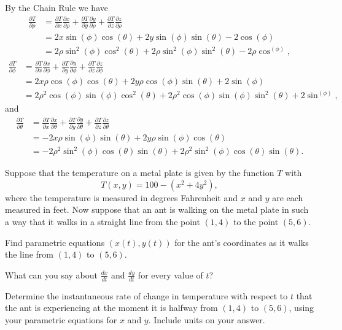 \begin{exercises}
\begin{exerciseSolution}
    \item By the Chain Rule we have 
\begin{align*}
\frac{\partial T}{\partial\rho} &= \frac{\partial T}{\partial x} \frac{\partial x}{\partial\rho} + \frac{\partial T}{\partial y} \frac{\partial y}{\partial\rho}  + \frac{\partial T}{\partial z} \frac{\partial z}{\partial\rho} \\
	&= 2x\sin(\phi) \cos(\theta) + 2y\sin(\phi) \sin(\theta) - 2\cos(\phi) \\
	&= 2\rho\sin^2(\phi) \cos^2(\theta) + 2\rho\sin^2(\phi) \sin^2(\theta) - 2\rho\cos^(\phi),
\end{align*}
\begin{align*}
\frac{\partial T}{\partial \phi} &= \frac{\partial T}{\partial x} \frac{\partial x}{\partial \phi} + \frac{\partial T}{\partial y} \frac{\partial y}{\partial \phi}  + \frac{\partial T}{\partial z} \frac{\partial z}{\partial \phi} \\
	&= 2x \rho \cos(\phi) \cos(\theta) + 2y \rho \cos(\phi) \sin(\theta) + 2\sin(\phi) \\
	&= 2\rho^2 \cos(\phi) \sin(\phi) \cos^2(\theta) + 2\rho^2 \cos(\phi) \sin(\phi) \sin^2(\theta) + 2\sin^(\phi),
\end{align*}
and
\begin{align*}
\frac{\partial T}{\partial \theta} &= \frac{\partial T}{\partial x} \frac{\partial x}{\partial \theta} + \frac{\partial T}{\partial y} \frac{\partial y}{\partial \theta}  + \frac{\partial T}{\partial z} \frac{\partial z}{\partial \theta} \\
	&= -2x \rho \sin(\phi) \sin(\theta) + 2y \rho \sin(\phi) \cos(\theta)  \\
	&= -2\rho^2 \sin^2(\phi) \cos(\theta) \sin(\theta) + 2\rho^2 \sin^2(\phi) \cos(\theta) \sin(\theta).
\end{align*}

    \ea
    

\end{exerciseSolution}
     
\item Suppose that the temperature on a metal plate is given by
    the function $T$ with 
    $$
    T(x,y) = 100-(x^2 + 4y^2),
    $$
    where the temperature is measured in degrees Fahrenheit
    and $x$ and $y$ are each measured in feet. 
    Now suppose that an ant is walking on the metal plate in such a way that it walks in a straight line from the point $(1,4)$ to the point $(5,6)$.
    \ba
    	\item Find parametric equations $(x(t),y(t))$ for the ant's coordinates as it walks the line from $(1,4)$ to $(5,6)$.
	\item What can you say about $\frac{dx}{dt}$ and $\frac{dy}{dt}$ for every value of $t$?
	\item Determine the instantaneous rate of change in temperature with respect to $t$ that the ant is experiencing at the moment it is halfway from $(1,4)$ to $(5,6)$, using your parametric equations for $x$ and $y$.  Include units on your answer.
    \ea    


\end{exercises}
